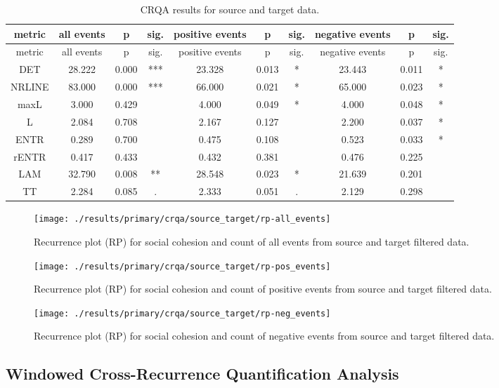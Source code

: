 \documentclass[english,man]{apa6}
\begin{document}
\begin{longtable}[]{@{}cccccccccc@{}}
\caption{CRQA results for source and target data.}\tabularnewline
\toprule
metric & all events & p & sig. & positive events & p & sig. & negative events & p & sig.\tabularnewline
\midrule
\endfirsthead
\toprule
metric & all events & p & sig. & positive events & p & sig. & negative events & p & sig.\tabularnewline
\midrule
\endhead
DET & 28.222 & 0.000 & *** & 23.328 & 0.013 & * & 23.443 & 0.011 & *\tabularnewline
NRLINE & 83.000 & 0.000 & *** & 66.000 & 0.021 & * & 65.000 & 0.023 & *\tabularnewline
maxL & 3.000 & 0.429 & & 4.000 & 0.049 & * & 4.000 & 0.048 & *\tabularnewline
L & 2.084 & 0.708 & & 2.167 & 0.127 & & 2.200 & 0.037 & *\tabularnewline
ENTR & 0.289 & 0.700 & & 0.475 & 0.108 & & 0.523 & 0.033 & *\tabularnewline
rENTR & 0.417 & 0.433 & & 0.432 & 0.381 & & 0.476 & 0.225 &\tabularnewline
LAM & 32.790 & 0.008 & ** & 28.548 & 0.023 & * & 21.639 & 0.201 &\tabularnewline
TT & 2.284 & 0.085 & . & 2.333 & 0.051 & . & 2.129 & 0.298 &\tabularnewline
\bottomrule
\end{longtable}

\begin{figure}
\texttt{[image: ./results/primary/crqa/source\_target/rp-all\_events]} \caption{Recurrence plot (RP) for social cohesion and count of all events from source and target filtered data.}\label{fig:plot-rp-source-targ-all}
\end{figure}

\begin{figure}
\texttt{[image: ./results/primary/crqa/source\_target/rp-pos\_events]} \caption{Recurrence plot (RP) for social cohesion and count of positive events from source and target filtered data.}\label{fig:plot-rp-source-targ-pos}
\end{figure}

\begin{figure}
\texttt{[image: ./results/primary/crqa/source\_target/rp-neg\_events]} \caption{Recurrence plot (RP) for social cohesion and count of negative events from source and target filtered data.}\label{fig:plot-rp-source-targ-neg}
\end{figure}

\hypertarget{windowed-cross-recurrence-quantification-analysis-1}{%
\subsection{Windowed Cross-Recurrence Quantification Analysis}\label{windowed-cross-recurrence-quantification-analysis-1}}
\end{document}
